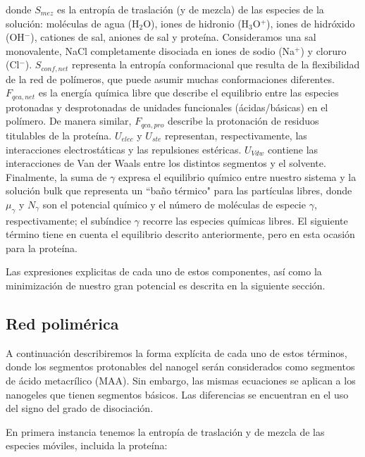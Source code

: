 \noindent donde $S_{mez}$ es la entrop\'ia de traslaci\'on (y de mezcla) de las especies de la soluci\'on: mol\'eculas de agua (H$_2$O), iones de hidronio (H$_3$O$^+$), iones de hidr\'oxido (OH$^- $), cationes de sal, aniones de sal y prote\'ina.
Consideramos una sal monovalente, NaCl completamente disociada en iones de sodio (Na$^+$) y cloruro (Cl$^-$).
$S_{conf,net}$ representa la entrop\'ia conformacional que resulta de la flexibilidad de la red de pol\'imeros, que puede asumir muchas conformaciones diferentes.
$F_{qca,net}$ es la energ\'ia qu\'imica libre que describe el equilibrio entre las especies protonadas y desprotonadas de unidades funcionales (\'acidas/b\'asicas) en el pol\'imero.
De manera similar, $F_{qca,pro}$ describe la protonaci\'on de residuos titulables de la prote\'ina.
$U_{elec}$ y $U_{ste}$ representan, respectivamente, las interacciones electrost\'aticas y las repulsiones est\'ericas.
$U_{Vdw}$ contiene las interacciones de Van der Waals entre los distintos segmentos y el solvente.
Finalmente, la suma de $\gamma$ expresa el equilibrio qu\'imico entre nuestro sistema y la soluci\'on bulk que representa un ``ba\~no t\'ermico" para las part\'iculas libres, donde $\mu_\gamma$ y $N_\gamma$ son el potencial qu\'imico y el n\'umero de mol\'eculas de especie $\gamma$, respectivamente;
el sub\'indice $\gamma$ recorre las especies qu\'imicas libres.
El siguiente t\'ermino tiene en cuenta el equilibrio descrito anteriormente, pero en esta ocasi\'on para la prote\'ina.

Las expresiones explicitas de cada uno de estos componentes, as\'i como la minimizaci\'on de nuestro gran potencial es descrita en la siguiente secci\'on.



\subsection{Red polim\'erica}\label{sec:esf:tm}

A continuaci\'on describiremos la forma expl\'icita de cada uno de estos t\'erminos, donde los segmentos protonables del nanogel ser\'an considerados como segmentos de \'acido metacrílico (MAA). Sin embargo, las mismas ecuaciones se aplican a los nanogeles que tienen segmentos b\'asicos. Las diferencias se encuentran en el uso del signo del grado de disociaci\'on.

En primera instancia tenemos la entrop\'ia de traslaci\'on y de mezcla de las especies m\'oviles, incluida la prote\'ina:


